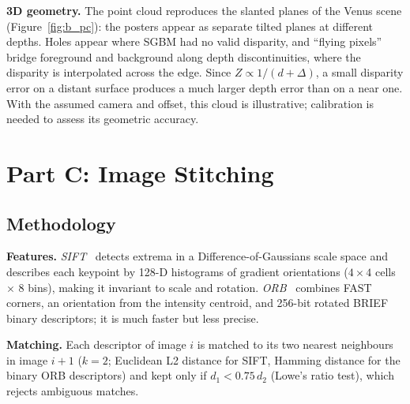 \documentclass[a4paper,12pt]{article}
\begin{document}
\textbf{3D geometry.} The point cloud reproduces the slanted planes of the Venus scene (Figure~\ref{fig:b_pc}): the posters appear as separate tilted planes at different depths. Holes appear where SGBM had no valid disparity, and ``flying pixels'' bridge foreground and background along depth discontinuities, where the disparity is interpolated across the edge. Since $Z\propto 1/(d+\Delta)$, a small disparity error on a distant surface produces a much larger depth error than on a near one. With the assumed camera and offset, this cloud is illustrative; calibration is needed to assess its geometric accuracy.

\begin{table}[H]
\centering
\caption{All BM and SGBM configurations.}
\label{tab:b_full}
\setlength{\tabcolsep}{3pt}\resizebox{\linewidth}{!}{}
\end{table}

\section{Part C: Image Stitching}\label{sec:C}
\subsection{Methodology}
\textbf{Features.} \emph{SIFT}~\cite{lowe2004} detects extrema in a Difference-of-Gaussians scale space and describes each keypoint by 128-D histograms of gradient orientations ($4\times4$ cells $\times$ 8 bins), making it invariant to scale and rotation. \emph{ORB}~\cite{rublee2011} combines FAST corners, an orientation from the intensity centroid, and 256-bit rotated BRIEF binary descriptors; it is much faster but less precise.

\textbf{Matching.} Each descriptor of image $i$ is matched to its two nearest neighbours in image $i+1$ ($k=2$; Euclidean L2 distance for SIFT, Hamming distance for the binary ORB descriptors) and kept only if $d_1<0.75\,d_2$ (Lowe's ratio test), which rejects ambiguous matches.
\end{document}
